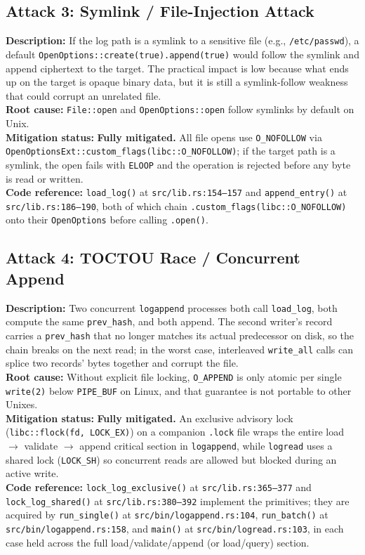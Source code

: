 \documentclass[a4paper, 12pt]{article}
\begin{document}
    \subsection{Attack 3: Symlink / File-Injection Attack}
    \textbf{Description:} If the log path is a symlink to a sensitive file (e.g., \texttt{/etc/passwd}), a default \texttt{OpenOptions::create(true).append(true)} would follow the symlink and append ciphertext to the target. The practical impact is low because what ends up on the target is opaque binary data, but it is still a symlink-follow weakness that could corrupt an unrelated file. \\
    \textbf{Root cause:} \texttt{File::open} and \texttt{OpenOptions::open} follow symlinks by default on Unix. \\
    \textbf{Mitigation status:} \textbf{Fully mitigated.} All file opens use \texttt{O\_NOFOLLOW} via \texttt{OpenOptionsExt::custom\_flags(libc::O\_NOFOLLOW)}; if the target path is a symlink, the open fails with \texttt{ELOOP} and the operation is rejected before any byte is read or written. \\
    \textbf{Code reference:} \texttt{load\_log()} at \texttt{src/lib.rs:154--157} and \texttt{append\_entry()} at \texttt{src/lib.rs:186--190}, both of which chain \texttt{.custom\_flags(libc::O\_NOFOLLOW)} onto their \texttt{OpenOptions} before calling \texttt{.open()}.

    \subsection{Attack 4: TOCTOU Race / Concurrent Append}
    \textbf{Description:} Two concurrent \texttt{logappend} processes both call \texttt{load\_log}, both compute the same \texttt{prev\_hash}, and both append. The second writer's record carries a \texttt{prev\_hash} that no longer matches its actual predecessor on disk, so the chain breaks on the next read; in the worst case, interleaved \texttt{write\_all} calls can splice two records' bytes together and corrupt the file. \\
    \textbf{Root cause:} Without explicit file locking, \texttt{O\_APPEND} is only atomic per single \texttt{write(2)} below \texttt{PIPE\_BUF} on Linux, and that guarantee is not portable to other Unixes. \\
    \textbf{Mitigation status:} \textbf{Fully mitigated.} An exclusive advisory lock (\texttt{libc::flock(fd, LOCK\_EX)}) on a companion \texttt{.lock} file wraps the entire load $\rightarrow$ validate $\rightarrow$ append critical section in \texttt{logappend}, while \texttt{logread} uses a shared lock (\texttt{LOCK\_SH}) so concurrent reads are allowed but blocked during an active write. \\
    \textbf{Code reference:} \texttt{lock\_log\_exclusive()} at \texttt{src/lib.rs:365--377} and \texttt{lock\_log\_shared()} at \texttt{src/lib.rs:380--392} implement the primitives; they are acquired by \texttt{run\_single()} at \texttt{src/bin/logappend.rs:104}, \texttt{run\_batch()} at \texttt{src/bin/logappend.rs:158}, and \texttt{main()} at \texttt{src/bin/logread.rs:103}, in each case held across the full load/validate/append (or load/query) section.
\end{document}
